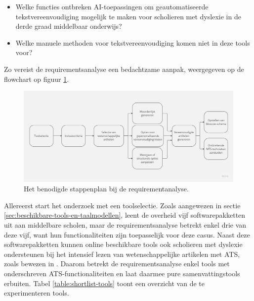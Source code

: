 \begin{itemize}
	\item Welke functies ontbreken AI-toepassingen om geautomatiseerde tekstvereenvoudiging mogelijk te maken voor scholieren met dyslexie in de derde graad middelbaar onderwijs?
	\item Welke manuele methoden voor tekstvereenvoudiging komen niet in deze tools voor?
\end{itemize}

Zo vereist de requirementsanalyse een bedachtzame aanpak, weergegeven op de flowchart op figuur \ref{img:flowchart-requirementsanalyse}.

\begin{figure}[H]
	\includegraphics[width=\linewidth]{img/flowchart-requirementsanalyse.jpg}
	\caption{Het benodigde stappenplan bij de requirementanalyse.}
	\label{img:flowchart-requirementsanalyse}
\end{figure}

Allereerst start het onderzoek met een toolselectie. Zoals aangewezen in sectie \ref{sec:beschikbare-tools-en-taalmodellen}, leent de overheid vijf softwarepakketten uit aan middelbare scholen, maar de requirementsanalyse betrekt enkel drie van deze vijf, want hun functionaliteiten zijn toepasselijk voor deze casus. Naast deze softwarepakketten kunnen online beschikbare tools ook scholieren met dyslexie ondersteunen bij het intensief lezen van wetenschappelijke artikelen met ATS, zoals bewezen in \textcite{Bingel2018}. Daarom betrekt de requirementsanalyse enkel tools met onderschreven ATS-functionaliteiten en laat daarmee pure samenvattingstools erbuiten. Tabel \ref{table:shortlist-tools} toont een overzicht van de te experimenteren tools.

